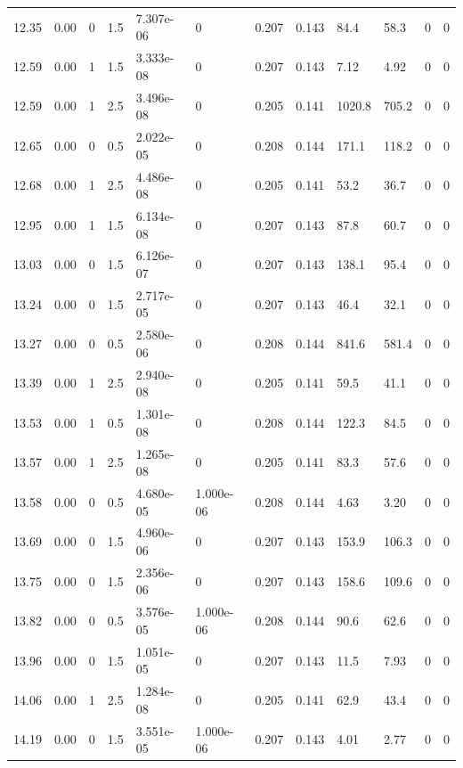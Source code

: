 \documentclass[preview]{standalone}
\begin{document}
{{{{\begin{tabular}{L{1.2cm}C{1.2cm} C{0.3cm}C{0.5cm} C{1.4cm}C{1.4cm} C{1.4cm}C{1.4cm} C{1.6cm}C{1.6cm} C{1.6cm}C{1.6cm}}
  12.35  &  0.00  & 0     & 1.5 &  7.307e-06  & 0  &  0.207&   0.143& 84.4 & 58.3   &  0 & 0  \\ 
  12.59  &  0.00  & 1     & 1.5 &  3.333e-08  & 0  &  0.207&   0.143& 7.12 & 4.92   &  0 & 0  \\ 
  12.59  &  0.00  & 1     & 2.5 &  3.496e-08  & 0  &  0.205&   0.141& 1020.8 & 705.2   &  0 & 0  \\ 
  12.65  &  0.00  & 0     & 0.5 &  2.022e-05  & 0  &  0.208&   0.144& 171.1 & 118.2   &  0 & 0  \\ 
  12.68  &  0.00  & 1     & 2.5 &  4.486e-08  & 0  &  0.205&   0.141& 53.2 & 36.7   &  0 & 0  \\ 
  12.95  &  0.00  & 1     & 1.5 &  6.134e-08  & 0  &  0.207&   0.143& 87.8 & 60.7   &  0 & 0  \\ 
  13.03  &  0.00  & 0     & 1.5 &  6.126e-07  & 0  &  0.207&   0.143& 138.1 & 95.4   &  0 & 0  \\ 
  13.24  &  0.00  & 0     & 1.5 &  2.717e-05  & 0  &  0.207&   0.143& 46.4 & 32.1   &  0 & 0  \\ 
  13.27  &  0.00  & 0     & 0.5 &  2.580e-06  & 0  &  0.208&   0.144& 841.6 & 581.4   &  0 & 0  \\ 
  13.39  &  0.00  & 1     & 2.5 &  2.940e-08  & 0  &  0.205&   0.141& 59.5 & 41.1   &  0 & 0  \\ 
  13.53  &  0.00  & 1     & 0.5 &  1.301e-08  & 0  &  0.208&   0.144& 122.3 & 84.5   &  0 & 0  \\ 
  13.57  &  0.00  & 1     & 2.5 &  1.265e-08  & 0  &  0.205&   0.141& 83.3 & 57.6   &  0 & 0  \\ 
  13.58  &  0.00  & 0     & 0.5 &  4.680e-05  & 1.000e-06  &  0.208&   0.144& 4.63 & 3.20   &  0 & 0  \\ 
  13.69  &  0.00  & 0     & 1.5 &  4.960e-06  & 0  &  0.207&   0.143& 153.9 & 106.3   &  0 & 0  \\ 
  13.75  &  0.00  & 0     & 1.5 &  2.356e-06  & 0  &  0.207&   0.143& 158.6 & 109.6   &  0 & 0  \\ 
  13.82  &  0.00  & 0     & 0.5 &  3.576e-05  & 1.000e-06  &  0.208&   0.144& 90.6 & 62.6   &  0 & 0  \\ 
  13.96  &  0.00  & 0     & 1.5 &  1.051e-05  & 0  &  0.207&   0.143& 11.5 & 7.93   &  0 & 0  \\ 
  14.06  &  0.00  & 1     & 2.5 &  1.284e-08  & 0  &  0.205&   0.141& 62.9 & 43.4   &  0 & 0  \\ 
  14.19  &  0.00  & 0     & 1.5 &  3.551e-05  & 1.000e-06  &  0.207&   0.143& 4.01 & 2.77   &  0 & 0  \\ 

\end{tabular}}}}}
\end{document}
